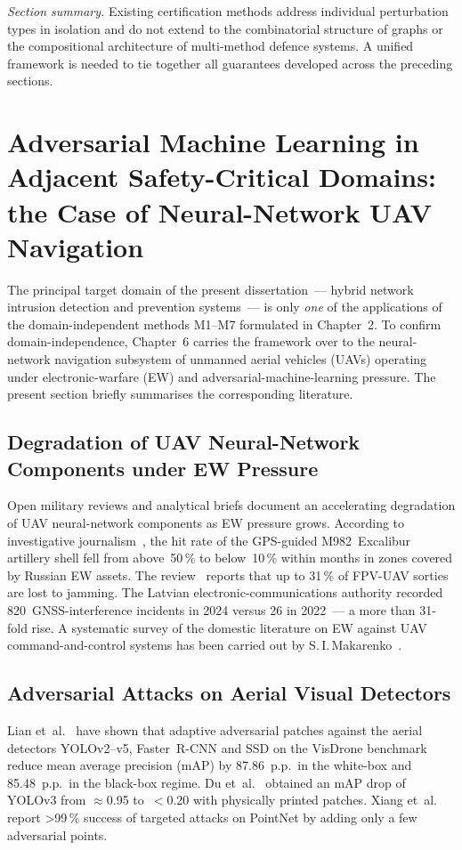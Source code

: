 \medskip
\noindent\textit{Section summary.} Existing certification methods address individual perturbation types in isolation and do not extend to the combinatorial structure of graphs or the compositional architecture of multi-method defence systems. A unified framework is needed to tie together all guarantees developed across the preceding sections.


\section{Adversarial Machine Learning in Adjacent Safety-Critical
Domains: the Case of Neural-Network UAV Navigation}
\label{sec:ch1_uav_related}

The principal target domain of the present dissertation~--- hybrid
network intrusion detection and prevention systems~--- is only
\emph{one} of the applications of the domain-independent methods
\textsf{M1}--\textsf{M7} formulated in Chapter~2. To confirm
domain-independence, Chapter~6 carries the framework over to the
neural-network navigation subsystem of unmanned aerial vehicles
(UAVs) operating under electronic-warfare (EW) and
adversarial-machine-learning pressure. The present section briefly
summarises the corresponding literature.

\subsection{Degradation of UAV Neural-Network Components under EW
Pressure}
Open military reviews and analytical briefs document an accelerating
degradation of UAV neural-network components as EW pressure grows.
According to investigative journalism~\cite{wapo_excalibur_2024},
the hit rate of the GPS-guided M982~Excalibur artillery shell fell
from above~50\,\% to below~10\,\% within months in zones covered by
Russian EW assets. The review~\cite{inside_uas_2025} reports that up
to 31\,\% of FPV-UAV sorties are lost to jamming. The Latvian
electronic-communications authority recorded 820~GNSS-interference
incidents in 2024 versus 26 in 2022~--- a more than 31-fold rise.
A systematic survey of the domestic literature on EW against UAV
command-and-control systems has been carried out by
S.\,I.\,Makarenko~\cite{Makarenko2022uav}.

\subsection{Adversarial Attacks on Aerial Visual Detectors}
Lian et~al.~\cite{lian_2022_uav} have shown that adaptive
adversarial patches against the aerial detectors YOLOv2--v5,
Faster~R-CNN and SSD on the VisDrone benchmark reduce mean average
precision (mAP) by 87.86~p.p.\ in the white-box and 85.48~p.p.\ in
the black-box regime. Du et~al.~\cite{du_2022_uav} obtained an
mAP drop of YOLOv3 from $\approx$0.95 to~$<$0.20 with physically
printed patches. Xiang et~al.~\cite{xiang_2019_uav} report >99\,\%
success of targeted attacks on PointNet by adding only a few
adversarial points.

